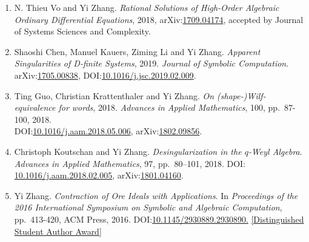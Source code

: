 \documentclass[a4paper,12pt]{article}
\begin{document}
\begin{enumerate}
 \item N. Thieu Vo and Yi Zhang. {\em Rational Solutions of High-Order Algebraic Ordinary Differential Equations}, 2018, 
 arXiv:\href{https://arxiv.org/abs/1709.04174}{1709.04174}, accepted by Journal of Systems Sciences and Complexity.
  \item Shaoshi Chen, Manuel Kauers, Ziming Li and Yi Zhang. {\em Apparent Singularities of D-finite Systems}, 2019. 
 {\em  Journal of Symbolic Computation}. arXiv:\href{http://arxiv.org/abs/1705.00838}{1705.00838},  
 DOI:\href{https://doi.org/10.1016/j.jsc.2019.02.009}{10.1016/j.jsc.2019.02.009}.
\item Ting Guo, Christian Krattenthaler and Yi Zhang.
{\em On (shape-)Wilf-equivalence for words}, 2018.
{\em  Advances in Applied Mathematics}, 100, pp.\ 87-100, 2018. \\
DOI:\href{https://doi.org/10.1016/j.aam.2018.05.006}{10.1016/j.aam.2018.05.006}, 
arXiv:\href{https://arxiv.org/pdf/1802.09856.pdf}{1802.09856}.
\item Christoph Koutschan and Yi Zhang. {\em Desingularization in the $q$-Weyl Algebra}. 
{\em Advances in Applied Mathematics}, 97, pp.\ 80–101, 2018. 
DOI: \href{http://dx.doi.org/10.1016/j.aam.2018.02.005}{10.1016/j.aam.2018.02.005},
arXiv:\href{https://arxiv.org/abs/1801.04160}{1801.04160}.   
\item Yi Zhang. {\em Contraction of Ore Ideals with Applications}. 
In {\em Proceedings of the 2016 International Symposium on Symbolic and Algebraic Computation}, 
pp.\ 413-420, ACM Press, 2016. DOI:\href{http://dl.acm.org/citation.cfm?id=2930890}{10.1145/2930889.2930890.} 
\href{https://www.sigsam.org/Awards/ISSACAwards.html}{[Distinguished Student Author Award]}
\end{enumerate}
\end{document}
